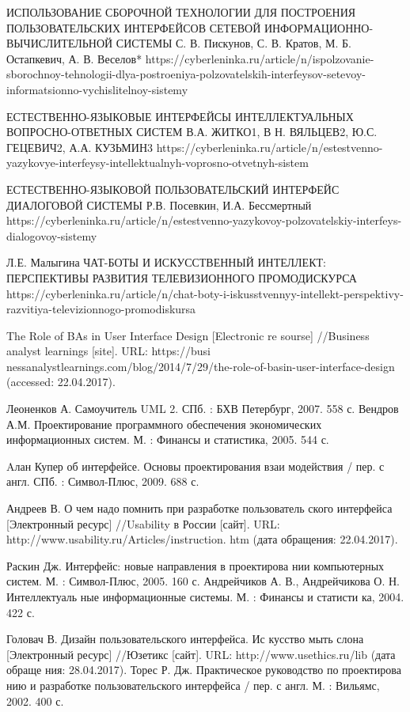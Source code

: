 \documentclass{article}
\begin{document}
ИСПОЛЬЗОВАНИЕ СБОРОЧНОЙ ТЕХНОЛОГИИ ДЛЯ ПОСТРОЕНИЯ ПОЛЬЗОВАТЕЛЬСКИХ ИНТЕРФЕЙСОВ СЕТЕВОЙ ИНФОРМАЦИОННО-ВЫЧИСЛИТЕЛЬНОЙ
СИСТЕМЫ
С. В. Пискунов, С. В. Кратов, М. Б. Остапкевич, А. В. Веселов*
https://cyberleninka.ru/article/n/ispolzovanie-sborochnoy-tehnologii-dlya-postroeniya-polzovatelskih-interfeysov-setevoy-informatsionno-vychislitelnoy-sistemy

 ЕСТЕСТВЕННО-ЯЗЫКОВЫЕ ИНТЕРФЕЙСЫ ИНТЕЛЛЕКТУАЛЬНЫХ ВОПРОСНО-ОТВЕТНЫХ СИСТЕМ
В.А. ЖИТКО1, В Н. ВЯЛЬЦЕВ2, Ю.С. ГЕЦЕВИЧ2, А.А. КУЗЬМИН3
https://cyberleninka.ru/article/n/estestvenno-yazykovye-interfeysy-intellektualnyh-voprosno-otvetnyh-sistem

ЕСТЕСТВЕННО-ЯЗЫКОВОЙ ПОЛЬЗОВАТЕЛЬСКИЙ ИНТЕРФЕЙС
ДИАЛОГОВОЙ СИСТЕМЫ
Р.В. Посевкин, И.А. Бессмертный https://cyberleninka.ru/article/n/estestvenno-yazykovoy-polzovatelskiy-interfeys-dialogovoy-sistemy

 Л.Е. Малыгина
ЧАТ-БОТЫ И ИСКУССТВЕННЫЙ ИНТЕЛЛЕКТ: ПЕРСПЕКТИВЫ РАЗВИТИЯ ТЕЛЕВИЗИОННОГО ПРОМОДИСКУРСА 
https://cyberleninka.ru/article/n/chat-boty-i-iskusstvennyy-intellekt-perspektivy-razvitiya-televizionnogo-promodiskursa

The Role of BAs in User Interface Design [Electronic re  sourse] //Business analyst learnings [site]. URL: https://busi  nessanalystlearnings.com/blog/2014/7/29/the-role-of-basin-user-interface-design (accessed: 22.04.2017). 

Леоненков А. Самоучитель UML 2. СПб. : БХВ Петербург, 2007. 558 с.
 Вендров А.М. Проектирование программного обеспечения экономических информационных систем. М. : Финансы и статистика, 2005. 544 с.

Aлан Купер об интерфейсе. Основы проектирования взаи  модействия / пер. с англ. СПб. : Символ-Плюс, 2009. 688 с.

Андреев В. О чем надо помнить при разработке пользователь  ского интерфейса [Электронный ресурс] //Usability в России [сайт]. URL: http://www.usability.ru/Articles/instruction. htm (дата обращения: 22.04.2017).

 Раскин Дж. Интерфейс: новые направления в проектирова  нии компьютерных систем. М. : Символ-Плюс, 2005. 160 с.
 Андрейчиков А. В., Андрейчикова О. Н. Интеллектуаль  ные информационные системы. М. : Финансы и статисти  ка, 2004. 422 с.

Головач В. Дизайн пользовательского интерфейса. Ис  кусство мыть слона [Электронный ресурс] //Юзетикс [сайт]. URL: http://www.usethics.ru/lib (дата обраще  ния: 28.04.2017).
Торес Р. Дж. Практическое руководство по проектирова  нию и разработке пользовательского интерфейса / пер. с англ. М. : Вильямс, 2002. 400 с.
\end{document}
